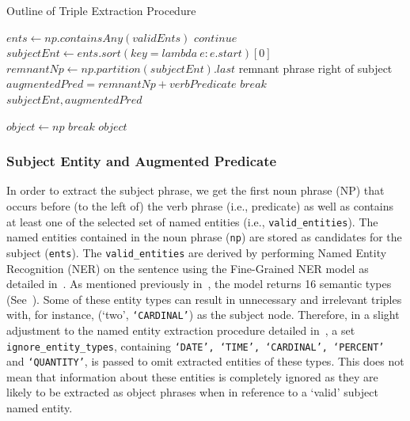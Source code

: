 \begin{algorithm}[H]
  \caption{Outline of Triple Extraction Procedure}
  \label{alg:subject_relation}
  \begin{algorithmic}   
    
      \State $ents \gets np.containsAny(validEnts)$ 
        \State $continue$
        \EndIf
      \State $subjectEnt \gets ents.sort(key = lambda \ e: e.start)[0]$
      \State $remnantNp \gets np.partition(subjectEnt).last$ 
      \Comment remnant phrase right of subject
      \State $augmentedPred = remnantNp + verbPredicate $
      \State $break$
      \EndIf
    \EndFor
    \State \Return $subjectEnt, augmentedPred$
  \EndFunction

      \State $object \gets np$ 
      \State $break$
      \EndIf
    \EndFor
    \State \Return $object$
  \EndFunction
\end{algorithmic}
\end{algorithm}

\vspace{-3ex}
\subsubsection{Subject Entity and Augmented Predicate}
In order to extract the subject phrase, we get the first noun phrase (NP) that occurs before (to the left of) the verb phrase (i.e., predicate) as well as contains at least one of the selected set of named entities (i.e., \texttt{valid\_entities}). The named entities contained in the noun phrase (\texttt{np}) are stored as candidates for the subject (\texttt{ents}). The \texttt{valid\_entities} are derived by performing Named Entity Recognition (NER) on the sentence using the Fine-Grained NER model as detailed in~. As mentioned previously in~, the model returns 16 semantic types (See~). Some of these entity types can result in unnecessary and irrelevant triples with, for instance, (`two', \texttt{`CARDINAL'}) as the subject node. Therefore, in a slight adjustment to the named entity extraction procedure detailed in~, a set \texttt{ignore\_entity\_types}, containing \texttt{`DATE', `TIME', `CARDINAL', `PERCENT'} and \texttt{`QUANTITY'}, is passed to omit extracted entities of these types. This does not mean that information about these entities is completely ignored as they are likely to be extracted as object phrases when in reference to a `valid' subject named entity. 

